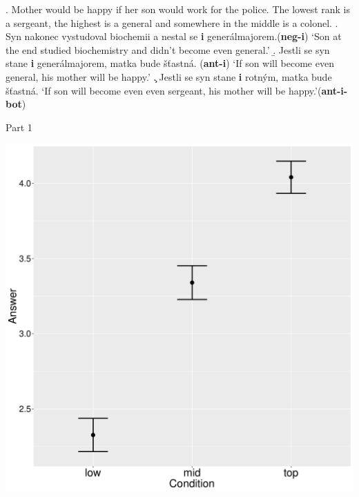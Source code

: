 \documentclass[ignorenonframetext,]{beamer}
\newcommand{\cond}[1]{\textbf{#1}}
\begin{document}
\begin{frame}

\ex. Mother would be happy if her son would work for the police. The
lowest rank is a sergeant, the highest is a general and somewhere in the
middle is a colonel.\label{ex-2} \a. Syn nakonec vystudoval biochemii a
nestal se \textbf{i}
generálmajorem.\hfill (\cond{neg-i})\label{ex-2-d}\newline
`Son at the end studied biochemistry and didn't become even general.'
\b. Jestli se syn stane \textbf{i} generálmajorem, matka bude šťastná.
\hfill (\cond{ant-i})\label{ex-2-e}\newline
`If son will become even general, his mother will be happy.' \c. Jestli
se syn stane \textbf{i} rotným, matka bude šťastná. \newline
`If son will become even even sergeant, his mother will be
happy.'\hfill (\cond{ant-i-bot})

\end{frame}


\begin{frame}{Part 1}

\begin{center}
\includegraphics[scale=0.3]{exp1-part_1-errorbars.pdf}
\end{center}

\end{frame}
\end{document}
